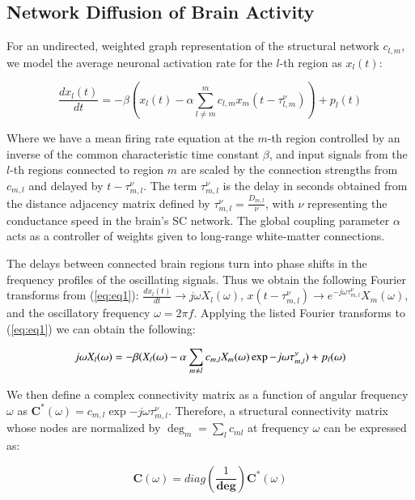 \subsection{Network Diffusion of Brain Activity}
For an undirected, weighted graph representation of the structural network $c_{l,m}$, we model the average neuronal activation rate for the $l$-th region as $x_{l}(t)$:

\begin{equation} 
    \label{eq:eq1}
    \frac{dx_{l}(t)}{dt} = -\beta (x_{l}(t) - \alpha \sum_{l \ne m}^{m} c_{l,m} x_{m}(t-\tau^{\nu}_{l,m})) + p_{l}(t)
\end{equation}

Where we have a mean firing rate equation at the $m$-th region controlled by an inverse of the common characteristic time constant $\beta$, and input signals from the $l$-th regions connected to region $m$ are scaled by the connection strengths from $c_{m,l}$ and delayed by $t-\tau^{\nu}_{m,l}$. The term $\tau^{\nu}_{m,l}$ is the delay in seconds obtained from the distance adjacency matrix defined by $\tau^{\nu}_{m,l} = \frac{D_{m,l}}{\nu}$, with $\nu$ representing the conductance speed in the brain's SC network. The global coupling parameter $\alpha$ acts as a controller of weights given to long-range white-matter connections.

The delays between connected brain regions turn into phase shifts in the frequency profiles of the oscillating signals. Thus we obtain the following Fourier transforms from (\ref{eq:eq1}): $\frac{dx_{l}(t)}{dt} \to j\omega X_{l}(\omega)$, $x(t-\tau^{\nu}_{m,l}) \to e^{-j\omega \tau^{\nu}_{m,l}} X_{m}(\omega)$, and the oscillatory frequency $\omega = 2 \pi f$. Applying the listed Fourier transforms to (\ref{eq:eq1}) we can obtain the following:

\begin{equation}
    \label{eq:eq2}
    j\omega X_{l}(\omega) = -\beta (X_{l}(\omega) - \alpha \sum_{m \ne l}{c_{m,l}X_{m}(\omega)\exp{-j \omega \tau^{\nu}_{m,l}}}) + p_{l}(\omega)\\
\end{equation}

We then define a complex connectivity matrix as a function of angular frequency $\omega$ as $\pmb{C}^{*}(\omega)={c_{m,l}\exp{-j \omega \tau^{\nu}_{m,l}}}$. Therefore, a structural connectivity matrix whose nodes are normalized by $\deg_{m} = \sum_{l} c_{ml}$ at frequency $\omega$ can be expressed as:

\begin{equation}
    \label{eq:eq3}
    \pmb{C}(\omega) = diag(\frac{1}{\pmb{\deg}}) \pmb{C}^{*}(\omega)
\end{equation}

